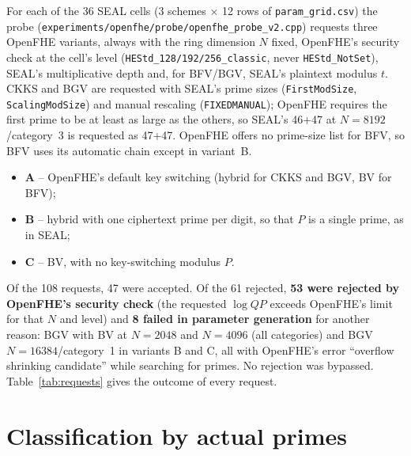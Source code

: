 \documentclass[11pt]{article}
\begin{document}
For each of the 36 SEAL cells (3 schemes $\times$ 12 rows of \texttt{param\_grid.csv}) the probe (\texttt{experiments/openfhe/probe/openfhe\_probe\_v2.cpp}) requests three OpenFHE variants, always with the ring dimension $N$ fixed, OpenFHE's security check at the cell's level (\texttt{HEStd\_128/192/256\_classic}, never \texttt{HEStd\_NotSet}), SEAL's multiplicative depth and, for BFV/BGV, SEAL's plaintext modulus $t$. CKKS and BGV are requested with SEAL's prime sizes (\texttt{FirstModSize}, \texttt{ScalingModSize}) and manual rescaling (\texttt{FIXEDMANUAL}); OpenFHE requires the first prime to be at least as large as the others, so SEAL's 46+47 at $N{=}8192$/category~3 is requested as 47+47. OpenFHE offers no prime-size list for BFV, so BFV uses its automatic chain except in variant~B.
\begin{itemize}[leftmargin=*, itemsep=1pt]
  \item \textbf{A} -- OpenFHE's default key switching (hybrid for CKKS and BGV, BV for BFV);
  \item \textbf{B} -- hybrid with one ciphertext prime per digit, so that $P$ is a single prime, as in SEAL;
  \item \textbf{C} -- BV, with no key-switching modulus $P$.
\end{itemize}

Of the 108 requests, 47 were accepted. Of the 61 rejected, \textbf{53 were rejected by OpenFHE's security check} (the requested $\log QP$ exceeds OpenFHE's limit for that $N$ and level) and \textbf{8 failed in parameter generation} for another reason: BGV with BV at $N{=}2048$ and $N{=}4096$ (all categories) and BGV $N{=}16384$/category~1 in variants B and C, all with OpenFHE's error ``overflow shrinking candidate'' while searching for primes. No rejection was bypassed. Table~\ref{tab:requests} gives the outcome of every request.

{\footnotesize\setlength{\tabcolsep}{4pt}
}
\vspace{-6pt}

\section{Classification by actual primes}
\label{sec:classes}
\end{document}
